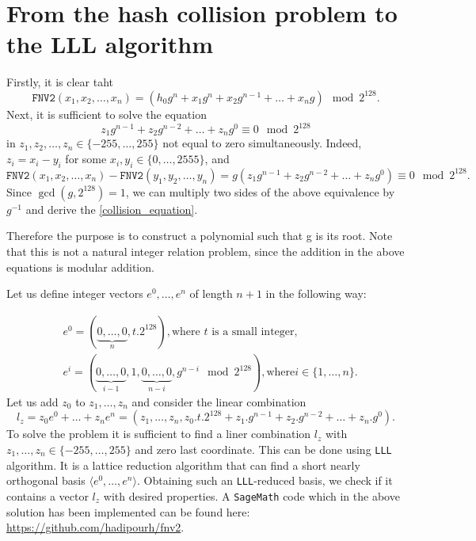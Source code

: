 \documentclass{iacrtrans}
\begin{document}
\section{From the hash collision problem to the LLL algorithm}
Firstly, it is clear taht
\begin{equation*}
\texttt{FNV2}(x_{1}, x_{2}, \ldots, x_{n}) = (h_{0}g^{n} + x_{1}g^{n} + x_{2}g^{n-1} + \ldots + x_{n}g) \mod 2^{128}.
\end{equation*}
Next, it is sufficient to solve the equation
\begin{equation}
\label{collision_equation}
z_{1}g^{n - 1} + z_{2}g^{n - 2} + \ldots + z_{n}g^{0} \equiv 0 \mod 2^{128}
\end{equation}
in $z_{1}, z_{2}, \ldots, z_{n}\in \{-255,\ldots, 255\}$ not equal to zero  simultaneously. Indeed, $z_{i} = x_{i} - y_{i}$ for some $x_{i}, y_{i}\in \{0, \ldots, 2555\}$, and 
\begin{equation*}
\texttt{FNV2}(x_{1}, x_{2}, \ldots, x_{n}) - \texttt{FNV2}(y_{1}, y_{2}, \ldots, y_{n}) = g(z_{1}g^{n-1} + z_{2}g^{n-2} + \ldots + z_{n}g^{0}) \equiv 0 \mod 2^{128}. 
\end{equation*}
Since $\gcd(g, 2^{128}) = 1$, we can multiply two sides of the above equivalence by $g^{-1}$ and derive the \ref{collision_equation}. 

Therefore the purpose is to construct a polynomial such that g is its root. Note that this is not a natural integer relation problem, since the addition in the above equations is modular addition. 

Let us define integer vectors $e^{0}, \ldots, e^{n}$ of length $n + 1$ in the following way:

\begin{align*}
&
e^{0} = (\underbrace{0, \ldots, 0}_{n}, t.2^{128}), \text{where $t$ is a small integer},\\
&e^{i} = (\underbrace{0, \ldots, 0}_{i-1}, 1, \underbrace{0, \ldots, 0}_{n-i}, g^{n - i} \mod 2^{128}), \text{where} i \in \{1, \ldots, n\}.
\end{align*}
Let us add $z_{0}$ to $z_{1}, \ldots, z_{n}$ and consider the linear combination
\begin{equation*}
l_{z} = z_{0}e^{0} + \ldots + z_{n}e^{n} = (z_{1}, \ldots, z_{n}, z_{0}.t.2^{128} + z_{1}.g^{n-1} + z_{2}.g^{n-2} + \ldots + z_{n}.g^{0}).
\end{equation*}
To solve the problem it is sufficient to find a liner combination $l_{z}$ with $z_{1}, \ldots, z_{n}\in \{-255, \ldots, 255\}$ and zero last coordinate. This can be done using \texttt{LLL} algorithm. It is a lattice reduction algorithm that can find a short nearly orthogonal basis $\langle e^{0}, \ldots, e^{n} \rangle$. Obtaining such an \texttt{LLL}-reduced basis, we check if it contains a vector $l_{z}$ with desired properties\cite{gorodilova2018problems}. A \texttt{SageMath} \cite{sagemath} code which in the above solution has been implemented can be found here: \url{https://github.com/hadipourh/fnv2}.

{}

\end{document}
